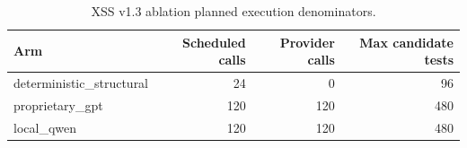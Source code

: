 \begin{table}[ht]
\centering
\caption{XSS v1.3 ablation planned execution denominators.}
\label{tab:xss-v13-ablation-denominators}
\begin{tabular}{lrrr}
\hline
Arm & Scheduled calls & Provider calls & Max candidate tests \\
\hline
deterministic\_structural & 24 & 0 & 96 \\
proprietary\_gpt & 120 & 120 & 480 \\
local\_qwen & 120 & 120 & 480 \\
\hline
\end{tabular}
\end{table}
